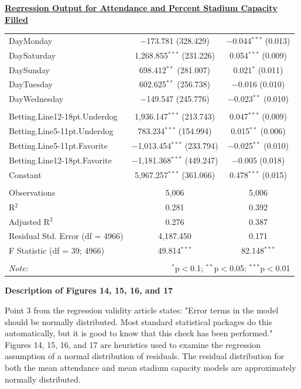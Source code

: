 \documentclass[preprint,12pt,times]{elsarticle}
\begin{document}
\begin{center}{\textbf{\ul{Regression Output for Attendance and Percent Stadium Capacity Filled}}}
\begin{longtable}{@{\extracolsep{5pt}}lcc}
 DayMonday & $-$173.781 (328.429) & $-$0.044$^{***}$ (0.013)\\ 
 DaySaturday & 1,268.855$^{***}$ (231.226) & 0.054$^{***}$ (0.009)\\ 
 DaySunday & 698.412$^{**}$ (281.007) & 0.021$^{*}$ (0.011)\\ 
 DayTuesday & 602.625$^{**}$ (256.738) & $-$0.016 (0.010)\\ 
 DayWednesday & $-$149.547 (245.776) & $-$0.023$^{**}$ (0.010)\\ 
\\
Betting.Line12-18pt.Underdog & 1,936.147$^{***}$ (213.743) & 0.047$^{***}$ (0.009)\\ 
Betting.Line5-11pt.Underdog & 783.234$^{***}$ (154.994) & 0.015$^{**}$ (0.006)\\ 
Betting.Line5-11pt.Favorite & $-$1,013.454$^{***}$ (233.794) & $-$0.025$^{**}$ (0.010)\\
Betting.Line12-18pt.Favorite & $-$1,181.368$^{***}$ (449.247) & $-$0.005 (0.018)\\
Constant & 5,967.257$^{***}$ (361.066) & 0.478$^{***}$ (0.015)\\ 
\hline \\[-1.8ex] 
Observations & 5,006 & 5,006 \\ 
R$^{2}$ & 0.281 & 0.392 \\ 
Adjusted R$^{2}$ & 0.276 & 0.387 \\ 
Residual Std. Error (df = 4966) & 4,187.450 & 0.171 \\ 
F Statistic (df = 39; 4966) & 49.814$^{***}$ & 82.148$^{***}$ \\ 
\hline 
\hline \\[-1.8ex] 
\textit{Note:}  & \multicolumn{2}{r}{$^{*}$p$<$0.1; $^{**}$p$<$0.05; $^{***}$p$<$0.01} \\ 
\end{longtable}
\end{center}

\newpage
\noindent
\begin{large}
\textbf{Description of Figures 14, 15, 16, and 17}
\end{large}

Point 3 from the regression validity article states: "Error terms in the model should be normally distributed. Most standard statistical packages do this automatically, but it is good to know that this check has been performed."  Figures 14, 15, 16, and 17 are heuristics used to examine the regression assumption of a normal distribution of residuals.  The residual distribution for both the mean attendance and mean stadium capacity models are approximately normally distributed.
\end{document}
